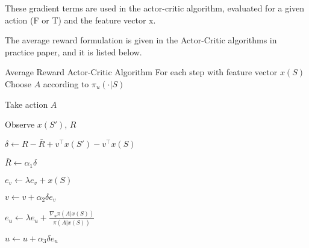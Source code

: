 \documentclass{article}
\begin{document}
\hline

These gradient terms are used in the actor-critic algorithm, evaluated for a given action (F or T) and the feature vector x.

The average reward formulation is given in the Actor-Critic algorithms in practice paper, and it is listed below.


\begin{algorithm}
\item Average Reward Actor-Critic Algorithm
  \hline
\STATE For each step with feature vector $x(S)$\\
\STATE Choose $A$ according to $\pi_u(\cdot| S)$
\item Take action $A$
\item Observe $x(S')$, $R$
\item $\delta \leftarrow R -\bar{R} + v^\top x(S') - v^\top x(S)$
\item $ \bar R \leftarrow \alpha_1  \delta $
\item $e_v \leftarrow \lambda e_v + x(S) $
\item $v \leftarrow v + \alpha_2 \delta e_v $
\item $e_u \leftarrow \lambda e_u + \frac{\nabla_u \pi(A | x(S)) }{\pi(A | x(S)) }$
\item $u \leftarrow u + \alpha_3 \delta e_u$
\end{algorithm}
\end{document}
